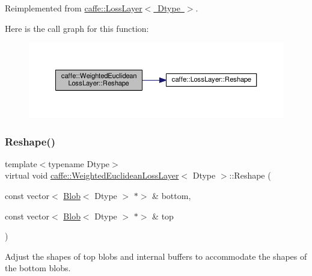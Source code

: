 Reimplemented from \mbox{\hyperlink{classcaffe_1_1_loss_layer_abf00412194f5413ea9468ee44b0d986f}{caffe\+::\+Loss\+Layer$<$ Dtype $>$}}.

Here is the call graph for this function\+:
\nopagebreak
\begin{figure}[H]
\begin{center}
\leavevmode
\includegraphics[width=350pt]{classcaffe_1_1_weighted_euclidean_loss_layer_a98e3de49ab49d66b8e3ebfe3aa4fbe20_cgraph}
\end{center}
\end{figure}
\mbox{\label{classcaffe_1_1_weighted_euclidean_loss_layer_ac9b915b132fb539ffdd610992c507974}} 
\subsubsection{\texorpdfstring{Reshape()}{Reshape()}\hspace{0.1cm}{\footnotesize\ttfamily [2/2]}}
{\footnotesize\ttfamily template$<$typename Dtype$>$ \\
virtual void \mbox{\hyperlink{classcaffe_1_1_weighted_euclidean_loss_layer}{caffe\+::\+Weighted\+Euclidean\+Loss\+Layer}}$<$ Dtype $>$\+::Reshape (\begin{DoxyParamCaption}\item[{const vector$<$ \mbox{\hyperlink{classcaffe_1_1_blob}{Blob}}$<$ Dtype $>$ $\ast$$>$ \&}]{bottom,  }\item[{const vector$<$ \mbox{\hyperlink{classcaffe_1_1_blob}{Blob}}$<$ Dtype $>$ $\ast$$>$ \&}]{top }\end{DoxyParamCaption})\hspace{0.3cm}{\ttfamily [virtual]}}



Adjust the shapes of top blobs and internal buffers to accommodate the shapes of the bottom blobs. 


